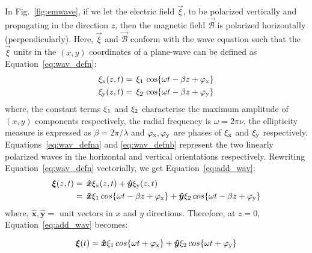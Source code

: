  In Fig.~\ref{fig:emwave}, if we let the electric field $\vec{\xi}$, to be  polarized vertically and propagating in the direction $z$, then the magnetic field $\vec{\mathcal{B}}$ 
 is polarized horizontally (perpendicularly). Here, $\vec{\xi}$  and $\vec{\mathcal{B}}$ conform with the wave equation such that 
 the $\vec{\xi}$ units in the $(x,y)$ coordinates  of a plane-wave can be defined  as Equation~\ref{eq:wav_defn}:
\begin{subequations}
\begin{align}
\xi_{\rm x}(z, t) & =\, \xi_{\rm 1}\, \cos\{\omega t - \beta z + \varphi_{\rm x} \} \label{eq:wav_defna} \\
\xi_{\rm y}(z, t)  & =\, \xi_{\rm 2}\, \cos\{\omega t - \beta z + \varphi_{\rm y} \} \label{eq:wav_defnb}
 \end{align} 
 \label{eq:wav_defn}
\end{subequations}
%
%
\noindent where, the constant terms $\xi_{\rm 1}$ and $\xi_{\rm 2}$ characterise the maximum amplitude of $(x, y)$ components respectively, 
the radial frequency is $\omega = 2\pi \nu$, the ellipticity measure is expressed as $\beta = 2 \pi / \lambda$ 
and $\varphi_{\rm x}, \varphi_{\rm y}$ are phases of $\xi_{\rm x}$ and $\xi_{\rm y}$ respectively.
Equations~\ref{eq:wav_defna} and \ref{eq:wav_defnb} represent the two linearly polarized waves in the horizontal and vertical orientations respectively. Rewriting
Equation~\ref{eq:wav_defn} vectorially, we get Equation~\ref{eq:add_wav}:
\begin{subequations}
\begin{align}  
   \boldsymbol{\xi}(z, t)  & =\, \boldsymbol{\hat{x}}\xi_{\rm x}(z, t) + \boldsymbol{\hat{y}}\xi_{\rm y}(z, t)\\
		& =\, \boldsymbol{\hat{x}}\xi_{\rm 1}\, cos\{\omega t - \beta z + \varphi_{\rm x} \} + \boldsymbol{\hat{y}}\xi_{\rm 2}\, cos\{\omega t - \beta z + \varphi_{\rm y} \}   
 \end{align} 
 \label{eq:add_wav}
\end{subequations} 
 where, $\bm{\hat{x}},\bm{\hat{y}} = $ unit vectors in $x$ and $y$ directions. Therefore, at $z = 0$, Equation~\ref{eq:add_wav} becomes:
 
 
\begin{equation}  
   \boldsymbol{\xi}(t)  = \boldsymbol{\hat{x}}\xi_{\rm 1}\, cos\{\omega t + \varphi_{\rm x} \} + \boldsymbol{\hat{y}}\xi_{\rm 2}\, cos\{\omega t + \varphi_{\rm y} \}  
  \label{eq:at_z}
 \end{equation} 
 
